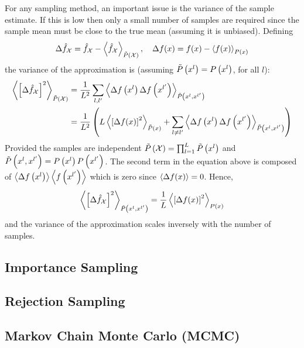 For any sampling method, an important issue is the variance of the sample estimate. If this is low then only a small number of samples are required since the sample mean must be close to the true mean (assuming it is unbiased). Defining
\begin{align*}
	\Delta\hat{f}_{\mathcal{X}}=\hat{f}_{\mathcal{X}}-\left\langle\hat{f}_{\mathcal{X}}\right\rangle_{\tilde{P}\left(\mathcal{X}\right)},\quad \Delta f(x)=f(x)-\left\langle f(x)\right\rangle_{P\left(x\right)}
\end{align*}
the variance of the approximation is (assuming $\tilde{P}\left(x^l\right)=P\left(x^l\right)$, for all $l$):
\begin{align*}
	\left\langle\left[\Delta\hat{f}_{\mathcal{X}}\right]^2\right\rangle_{\tilde{P}\left(\mathcal{X}\right)}&=\frac{1}{L^2}\sum_{l,l'}\left\langle\Delta f\left(x^l\right)\Delta f\left(x^{l'}\right)\right\rangle_{\tilde{P}\left(x^l,x^{l'}\right)} \\
	&=\frac{1}{L^2}\left(L\left\langle\left[\Delta f(x)\right]^2\right\rangle_{\tilde{P}\left(x\right)}+\sum_{l\neq l'}\left\langle\Delta f\left(x^l\right)\Delta f\left(x^{l'}\right)\right\rangle_{\tilde{P}\left(x^l,x^{l'}\right)}\right)
\end{align*}
Provided the samples are independent $\tilde{P}\left(\mathcal{X}\right)=\prod_{l=1}^L\tilde{P}\left(x^l\right)$ and $\tilde{P}\left(x^l,x^{l'}\right)=P\left(x^l\right)P\left(x^{l'}\right)$. The second term in the equation above is composed of $\left\langle\Delta f\left(x^l\right)\right\rangle\left\langle f\left(x^{l'}\right)\right\rangle$ which is zero since $\left\langle\Delta f(x)\right\rangle=0$. Hence,
\begin{align*}
	\left\langle\left[\Delta\hat{f}_{\mathcal{X}}\right]^2\right\rangle_{\tilde{P}\left(x^l,x^{l'}\right)}=\frac{1}{L}\left\langle\left[\Delta f(x)\right]^2\right\rangle_{P\left(x\right)}
\end{align*}
and the variance of the approximation scales inversely with the number of samples.

\subsection{Importance Sampling}

\subsection{Rejection Sampling}

\subsection{Markov Chain Monte Carlo (MCMC)}
